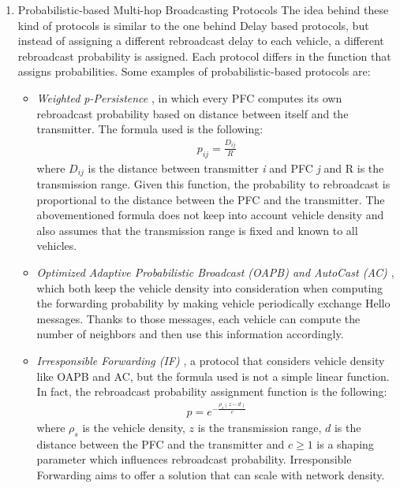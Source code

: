 \begin{enumerate}
			\item Probabilistic-based Multi-hop Broadcasting Protocols
			The idea behind these kind of protocols is similar to the one behind Delay based protocols, but instead of assigning a different rebroadcast delay to each vehicle, a different rebroadcast probability is assigned. Each protocol differs in the function that assigns probabilities. Some examples of probabilistic-based protocols are:
			\begin{itemize}
				\renewcommand\labelitemi{--}
		 		\item \textit{Weighted p-Persistence} \cite{4407231}, in which every PFC computes its own rebroadcast probability based on distance between itself and the transmitter. The formula used is the following:
				\begin{gather}
		 			p_{ij} = \frac{D_{ij}}{R}
		 			\label{eq:weighted-p-persistence}
 				\end{gather}
 				where $D_{ij}$ is the distance between transmitter \textit{i} and PFC \textit{j} and R is the transmission range. Given this function, the probability to rebroadcast is proportional to the distance between the PFC and the transmitter. The abovementioned formula does not keep into account vehicle density and also assumes that the transmission range is fixed and known to all vehicles.
 				
 				\item \textit{Optimized Adaptive Probabilistic Broadcast (OAPB)\cite{1543865} and AutoCast (AC) \cite{4350058}}, which both keep the vehicle density into consideration when computing the forwarding probability by making vehicle periodically exchange Hello messages. Thanks to those messages, each vehicle can compute the number of neighbors and then use this information accordingly.
 				
 				\item \textit{Irresponsible Forwarding (IF)} \cite{4740277}\cite{5426212}, a protocol that considers vehicle density like OAPB and AC, but the formula used is not a simple linear function. In fact, the rebroadcast probability assignment function is the following:
 				\begin{gather}
 					p = e^{-\frac{\rho_s(z-d)}{c}}
 				\end{gather}
 				where $\rho_s$ is the vehicle density, $z$ is the transmission range, $d$ is the distance between the PFC and the transmitter and $c\geq1$ is a shaping parameter which influences rebroadcast probability. Irresponsible Forwarding aims to offer a solution that can scale with network density.
			\end{itemize}
		

\end{enumerate}
